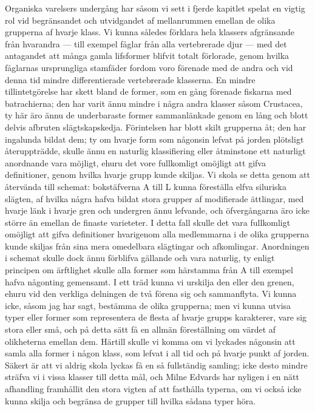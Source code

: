 Organiska varelsers undergång har såsom vi sett i fjerde kapitlet spelat en vigtig rol vid begränsandet och utvidgandet af mellanrummen emellan de olika grupperna af hvarje klass. Vi kunna således förklara hela klassers afgränsande från hvarandra — till exempel fåglar från alla vertebrerade djur — med det antagandet att många gamla lifsformer blifvit totalt förlorade, genom hvilka fåglarnas ursprungliga stamfäder fordom voro förenade med de andra och vid denna tid mindre differentierade vertebrerade klasserna. En mindre tillintetgörelse har skett bland de former, som en gång förenade fiskarna med batrachierna; den har varit ännu mindre i några andra klasser såsom Crustacea, ty här äro ännu de underbaraste former sammanlänkade genom en lång och blott delvis afbruten slägtskapskedja. Förintelsen har blott skilt grupperna åt; den har ingalunda bildat dem; ty om hvarje form som någonsin lefvat på jorden plötsligt återuppträdde, skulle ännu en naturlig klassifiering eller åtminstone ett naturligt anordnande vara möjligt, ehuru det vore fullkomligt omöjligt att gifva definitioner, genom hvilka hvarje grupp kunde skiljas. Vi skola se detta genom att återvända till schemat: bokstäfverna A till L kunna föreställa elfva siluriska slägten, af hvilka några hafva bildat stora grupper af modifierade ättlingar, med hvarje länk i hvarje gren och undergren ännu lefvande, och öfvergångarna äro icke större än emellan de finaste varieteter. I detta fall skulle det vara fullkomligt omöjligt att gifva definitioner hvarigenom alla medlemmarna i de olika grupperna kunde skiljas från sina mera omedelbara slägtingar och afkomlingar. Anordningen i schemat skulle dock ännu förblifva gällande och vara naturlig, ty enligt principen om ärftlighet skulle alla former som härstamma från A till exempel hafva någonting gemensamt. I ett träd kunna vi urskilja den eller den grenen, ehuru vid den verkliga delningen de två förena sig och sammanflyta. Vi kunna icke, såsom jag har sagt, bestämma de olika grupperna; men vi kunna utvisa typer eller former som representera de flesta af hvarje grupps karakterer, vare sig stora eller små, och på detta sätt få en allmän föreställning om värdet af olikheterna emellan dem. Härtill skulle vi komma om vi lyckades någonsin att samla alla former i någon klass, som lefvat i all tid och på hvarje punkt af jorden. Säkert är att vi aldrig skola lyckas få en så fullständig samling; icke desto mindre sträfva vi i vissa klasser till detta mål, och Milne Edvards har nyligen i en nätt afhandling framhållit den stora vigten af att fasthålla typerna, om vi också icke kunna skilja och begränsa de grupper till hvilka sådana typer höra.

